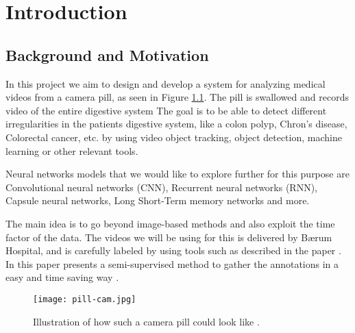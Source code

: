 \documentclass[thesis.tex]{subfiles}
\begin{document}
\chapter{Introduction} \label{chap:introduction}

\section{Background and Motivation} \label{sec:background_and_motivation}
In this project we aim to design and develop a system for analyzing medical videos from a camera pill, as seen in Figure \ref{fig:pill-cam}. The pill is swallowed and records video of the entire digestive system The goal is to be able to detect different irregularities in the patients digestive system, like a colon polyp, Chron's disease, Colorectal cancer, etc. by using video object tracking, object detection, machine learning or other relevant tools.

Neural networks models that we would like to explore further for this purpose are Convolutional neural networks (CNN), Recurrent neural networks (RNN), Capsule neural networks, Long Short-Term memory networks and more.

The main idea is to go beyond image-based methods and also exploit the time factor of the data. 
The videos we will be using for this is delivered by Bærum Hospital, and is carefully labeled by using tools such as described in the paper . In this paper \citeauthor*{ExpertDriven15} presents a semi-supervised method to gather the annotations in a easy and time saving way \cite{ExpertDriven15}.

\begin{figure}[H] %
  \begin{center}
    \texttt{[image: pill-cam.jpg]}
    \caption[Illustration of how such a camera pill could look like]{Illustration of how such a camera pill could look like \cite{PillCamCamera}.}
    \label{fig:pill-cam}
  \end{center}
\end{figure}
\end{document}
